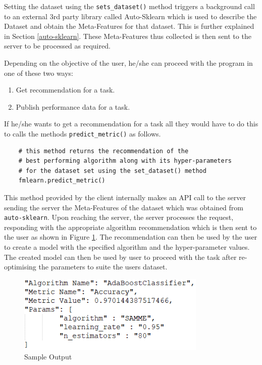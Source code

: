 Setting the dataset using the \texttt{sets\_dataset()} method triggers a background call to an external 3rd party library called Auto-Sklearn which is used to describe the Dataset and obtain the Meta-Features for that dataset. This is further explained in Section \ref{auto-sklearn}. These Meta-Features thus collected is then sent to the server to be processed as required.

Depending on the objective of the user, he/she can proceed with the program in one of these two ways:
\begin{enumerate}
    \item Get recommendation for a task.
    \item Publish performance data for a task.
\end{enumerate}
If he/she wants to get a recommendation for a task all they would have to do this to calls the methods \texttt{predict\_metric()} as follows.

\begin{lstlisting}
    # this method returns the recommendation of the
    # best performing algorithm along with its hyper-parameters
    # for the dataset set using the set_dataset() method
    fmlearn.predict_metric()
\end{lstlisting}

This method provided by the client internally makes an API call to the server sending the server the Meta-Features of the dataset which was obtained from \texttt{auto-sklearn}. Upon reaching the server, the server processes the request, responding with the appropriate algorithm recommendation which is then sent to the user as shown in Figure \ref{sample-output}. The recommendation can then be used by the user to create a model with the specified algorithm and the hyper-parameter values. The created model can then be used by user to proceed with the task after re-optimising the parameters to suite the users dataset.

\begin{figure}[H]
    \centering
    \includegraphics[width=9cm]{images/sample-output.png}
    \caption{Sample Output}
    \label{sample-output}
\end{figure}

